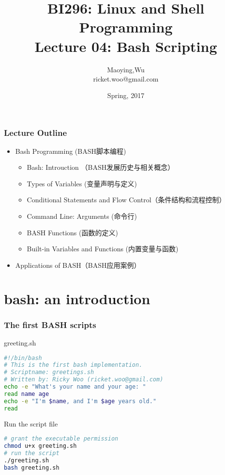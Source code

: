 \documentclass[red]{beamer}
\title[BI296-Lec04]{\tiny{BI296: Linux and Shell Programming}\\
\Large{Lecture 04: Bash Scripting}}
\author[Maoying Wu]{Maoying,Wu\\
{\scriptsize ricket.woo@gmail.com}}
\institute[CBB] %
{
  \inst{}
  Dept. of Bioinformatics \& Biostatistics\\
  Shanghai Jiao Tong University
}
\date{Spring, 2017}
\begin{document}
\begin{CJK*}{UTF8}{gbsn}
\frame{\titlepage}

\begin{frame}
\frametitle{Lecture Outline}
\begin{itemize}
	\item Bash Programming (BASH脚本编程)
	\begin{itemize}
		\item Bash: Introuction （BASH发展历史与相关概念）
		\item Types of Variables (变量声明与定义)
		\item Conditional Statements and Flow Control（条件结构和流程控制）
		\item Command Line: Arguments (命令行)
		\item BASH Functions (函数的定义)
		\item Built-in Variables and Functions (内置变量与函数)
	\end{itemize}
	\vspace{0.2in}
	\item Applications of BASH（BASH应用案例）
\end{itemize}
\end{frame}

\section{bash: an introduction}

\begin{frame}
\frametitle{The first BASH scripts}
\begin{block}{\centering greeting.sh}
\begin{lstlisting}[language=bash]
#!/bin/bash
# This is the first bash implementation.
# Scriptname: greetings.sh
# Written by: Ricky Woo (ricket.woo@gmail.com)
echo -e "What's your name and your age: "
read name age
echo -e "I'm $name, and I'm $age years old."
read
\end{lstlisting}
\end{block}
\begin{block}{\centering Run the script file}
\begin{lstlisting}[language=bash]
# grant the executable permission
chmod u+x greeting.sh
# run the script
./greeting.sh
bash greeting.sh
\end{lstlisting}
\end{block}
\end{frame}


\end{CJK*}
\end{document}

